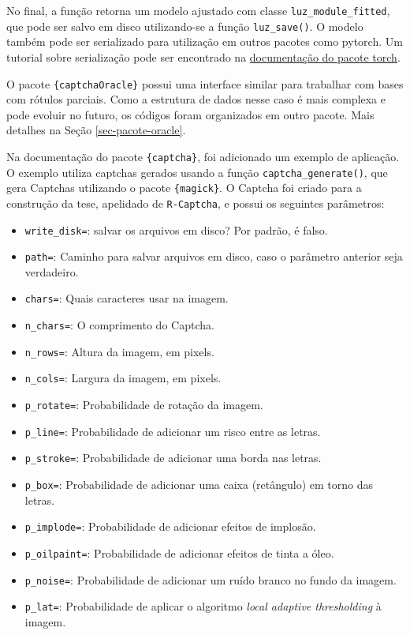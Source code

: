 \documentclass[12pt,twoside,brazilian]{book}
\providecommand{\tightlist}{%
  \setlength{\itemsep}{0pt}\setlength{\parskip}{0pt}}
\begin{document}
No final, a função retorna um modelo ajustado com classe
\texttt{luz\_module\_fitted}, que pode ser salvo em disco utilizando-se
a função \texttt{luz\_save()}. O modelo também pode ser serializado para
utilização em outros pacotes como pytorch. Um tutorial sobre
serialização pode ser encontrado na
\href{https://torch.mlverse.org/docs/articles/serialization.html}{documentação
do pacote torch}.

O pacote \texttt{\{captchaOracle\}} possui uma interface similar para
trabalhar com bases com rótulos parciais. Como a estrutura de dados
nesse caso é mais complexa e pode evoluir no futuro, os códigos foram
organizados em outro pacote. Mais detalhes na Seção
\ref{sec-pacote-oracle}.

Na documentação do pacote \texttt{\{captcha\}}, foi adicionado um
exemplo de aplicação. O exemplo utiliza captchas gerados usando a função
\texttt{captcha\_generate()}, que gera Captchas utilizando o pacote
\texttt{\{magick\}}. O Captcha foi criado para a construção da tese,
apelidado de \texttt{R-Captcha}, e possui os seguintes parâmetros:

\begin{itemize}
\tightlist
\item
  \texttt{write\_disk=}: salvar os arquivos em disco? Por padrão, é
  falso.
\item
  \texttt{path=}: Caminho para salvar arquivos em disco, caso o
  parâmetro anterior seja verdadeiro.
\item
  \texttt{chars=}: Quais caracteres usar na imagem.
\item
  \texttt{n\_chars=}: O comprimento do Captcha.
\item
  \texttt{n\_rows=}: Altura da imagem, em pixels.
\item
  \texttt{n\_cols=}: Largura da imagem, em pixels.
\item
  \texttt{p\_rotate=}: Probabilidade de rotação da imagem.
\item
  \texttt{p\_line=}: Probabilidade de adicionar um risco entre as
  letras.
\item
  \texttt{p\_stroke=}: Probabilidade de adicionar uma borda nas letras.
\item
  \texttt{p\_box=}: Probabilidade de adicionar uma caixa (retângulo) em
  torno das letras.
\item
  \texttt{p\_implode=}: Probabilidade de adicionar efeitos de implosão.
\item
  \texttt{p\_oilpaint=}: Probabilidade de adicionar efeitos de tinta a
  óleo.
\item
  \texttt{p\_noise=}: Probabilidade de adicionar um ruído branco no
  fundo da imagem.
\item
  \texttt{p\_lat=}: Probabilidade de aplicar o algoritmo \emph{local
  adaptive thresholding} à imagem.
\end{itemize}
\end{document}

